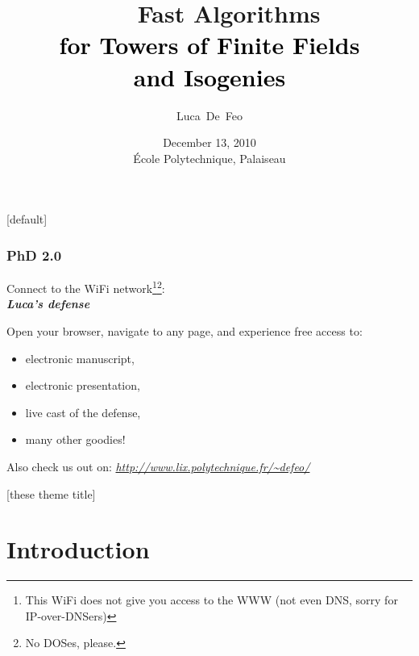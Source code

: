 \documentclass[10pt,usepdftitle=false]{beamer}
\title[Fast Algorithms for Towers of Finite Fields and Isogenies]{
  \def\svgwidth{2.63ex}
  \def\exclfont{\scriptsize\rmfamily}
  ~~~Fast Algorithms\\
  \normalsize\textcolor{black}{for Towers of Finite Fields\\and Isogenies}}
\author{Luca~De~Feo}
\institute[LIX \& INRIA Saclay]{LIX, École Polytechnique \& INRIA Saclay, Projet TANC}
\date[December 13, 2010]{December 13, 2010\\École Polytechnique, Palaiseau}
\begin{document}
{[default]
\begin{frame}
  \frametitle{PhD 2.0}
  
  \begin{center}
    \Large Connect to the WiFi network\footnote{This WiFi does not
      give you access to the WWW (not even DNS, sorry for
      IP-over-DNSers)}\footnote{No
      DOSes, please.}:\\
    \emph{\textbf{Luca's defense}} \end{center}

  \bigskip

  Open your browser, navigate to any page, and experience free
  access to:
  \begin{itemize}
  \item electronic manuscript,
  \item electronic presentation, %
  \item live cast of the defense,
  \item many other goodies!
  \end{itemize}

  \bigskip

  Also check us out on: \emph{\url{http://www.lix.polytechnique.fr/~defeo/}}
\end{frame}
}


{[these theme title]
\begin{frame}
  \titlepage
\end{frame}
}


\setcounter{framenumber}{0}
\section{Introduction}
\end{document}
